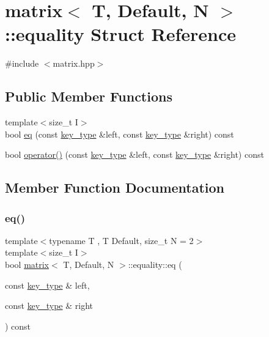\hypertarget{structmatrix_1_1equality}{}\section{matrix$<$ T, Default, N $>$\+:\+:equality Struct Reference}
\label{structmatrix_1_1equality}


{\ttfamily \#include $<$matrix.\+hpp$>$}

\subsection*{Public Member Functions}
\begin{DoxyCompactItemize}
\item 
{\footnotesize template$<$size\+\_\+t I$>$ }\\bool \hyperlink{structmatrix_1_1equality_ab16734b96772b8f80239b53db6b1c06e}{eq} (const \hyperlink{structmatrix_ae7906bda02f5d7f6744d9545c9465e13}{key\+\_\+type} \&left, const \hyperlink{structmatrix_ae7906bda02f5d7f6744d9545c9465e13}{key\+\_\+type} \&right) const
\item 
bool \hyperlink{structmatrix_1_1equality_a02ac97feafe27c33aa7af56977e5f538}{operator()} (const \hyperlink{structmatrix_ae7906bda02f5d7f6744d9545c9465e13}{key\+\_\+type} \&left, const \hyperlink{structmatrix_ae7906bda02f5d7f6744d9545c9465e13}{key\+\_\+type} \&right) const
\end{DoxyCompactItemize}


\subsection{Member Function Documentation}
\mbox{\label{structmatrix_1_1equality_ab16734b96772b8f80239b53db6b1c06e}} 
\subsubsection{\texorpdfstring{eq()}{eq()}}
{\footnotesize\ttfamily template$<$typename T , T Default, size\+\_\+t N = 2$>$ \\
template$<$size\+\_\+t I$>$ \\
bool \hyperlink{structmatrix}{matrix}$<$ T, Default, N $>$\+::equality\+::eq (\begin{DoxyParamCaption}\item[{const \hyperlink{structmatrix_ae7906bda02f5d7f6744d9545c9465e13}{key\+\_\+type} \&}]{left,  }\item[{const \hyperlink{structmatrix_ae7906bda02f5d7f6744d9545c9465e13}{key\+\_\+type} \&}]{right }\end{DoxyParamCaption}) const\hspace{0.3cm}{\ttfamily [inline]}}

